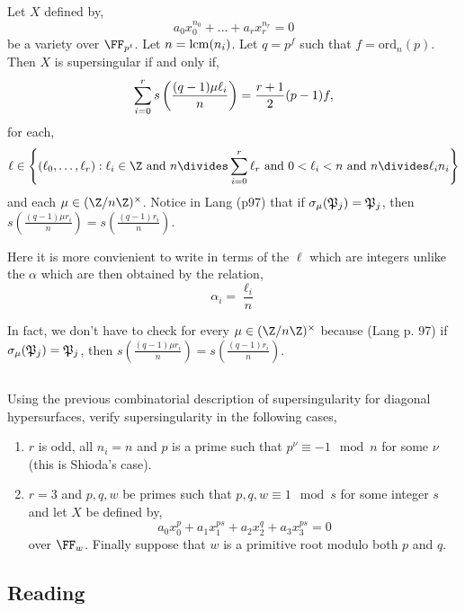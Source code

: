 \documentclass[12pt]{article}
\begin{document}
\begin{theorem}\label{thm:gauss_factor_SS}
Let $X$ defined by,
\[ a_0 x_0^{n_0} + \dots + a_r x_r^{n_r} = 0 \]
be a variety over $\FF_{p^t}$. Let $n = \mathrm{lcm}(n_i)$. Let $q = p^f$ such that $f = \text{ord}_n(p)$. Then $X$ is supersingular if and only if,
\[ \sum_{i = 0}^{r} s\left(  \frac{(q-1)\mu \ell_i}{n}  \right) = \frac{r+1}{2}(p - 1)f,\]
for each,
\[ \ell \in \left\{(\ell_0, \dots, \ell_r) : \ell_i \in \Z \text{ and } n \divides \sum_{i = 0}^{r} \ell_r \text{ and } 0 < \ell_i < n \text{ and } n \divides \ell_i n_i \right\} \]
and each $\mu \in (\Z/n\Z)^\times$. Notice in Lang (p97) that if $\sigma_\mu(\mathfrak{P}_j) = \mathfrak{P}_j$, then $s\left(\frac{(q-1)\mu r_i}{n}\right) = s\left(\frac{(q-1) r_i}{n}\right)$.
\end{theorem}

\begin{rmk}
Here it is more convienient to write in terms of the $\ell$ which are integers unlike the $\alpha$ which are then obtained by the relation,
\[ \alpha_i = \frac{\ell_i}{n} \] 
\end{rmk}

\begin{rmk}
In fact, we don't have to check for every $\mu \in (\Z / n \Z)^\times$ because (Lang p. 97) if $\sigma_\mu(\mathfrak{P}_j) = \mathfrak{P}_j$, then $s\left(\frac{(q-1)\mu r_i}{n}\right) = s\left(\frac{(q-1) r_i}{n}\right)$.
\end{rmk}


\subsection{}

Using the previous combinatorial description of supersingularity for diagonal hypersurfaces, verify supersingularity in the following cases,
\begin{enumerate}
\item $r$ is odd, all $n_i = n$ and $p$ is a prime such that $p^\nu \equiv -1 \mod n$ for some $\nu$ (this is Shioda's case).

\item $r = 3$ and $p,q,w$ be primes such that $p,q,w \equiv 1 \mod s$ for some integer $s$ and let $X$ be defined by,
\[ a_0 x_0^p + a_1 x_1^{ps} + a_2 x_2^q + a_3 x_3^{ps} = 0 \]
over $\FF_w$. Finally suppose that $w$ is a primitive root modulo both $p$ and $q$.
\end{enumerate}

\subsection{Reading}
\end{document}
